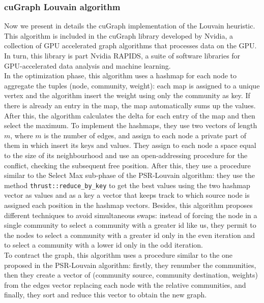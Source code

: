\subsubsection{cuGraph Louvain algorithm}
Now we present in details the cuGraph implementation of the Louvain heuristic. This algorithm is included in the cuGraph library developed by Nvidia, a collection of GPU accelerated graph algorithms that processes data on the GPU. In turn, this library is part Nvidia RAPIDS, a suite of software libraries for GPU-accelerated data analysis and machine learning.\\
In the optimization phase, this algorithm uses a hashmap for each node to aggregate the tuples (node, community, weight): each map is assigned to a unique vertex and the algorithm insert the weight using only the community as key. If there is already an entry in the map, the map automatically sums up the values. After this, the algorithm calculates the delta for each entry of the map and then select the maximum. To implement the hashmaps, they use two vectors of length $m$, where $m$ is the number of edges, and assign to each node a private part of them in which insert its keys and values. They assign to each node a space equal to the size of its neighbourhood and use an open-addressing procedure for the conflict, checking the subsequent free position. 
After this, they use a procedure similar to the Select Max sub-phase of the PSR-Louvain algorithm: 
they use the method \verb|thrust::reduce_by_key| to get the best values using the two hashmap vector as values and as a key a vector that keeps track to which source node is assigned each position in the hashmap vectors. Besides, this algorithm proposes different techniques to avoid simultaneous swaps: instead of forcing the node in a single community to select a community with a greater id like us, they permit to the nodes to select a community with a greater id only in the even iteration and to select a community with a lower id only in the odd iteration. \\
To contract the graph, this algorithm uses a procedure similar to the one proposed in the PSR-Louvain algorithm: firstly, they renumber the communities, then they create a vector of (community source, community destination, weights) from the edges vector replacing each node with the relative communities, and finally, they sort and reduce this vector to obtain the new graph.

